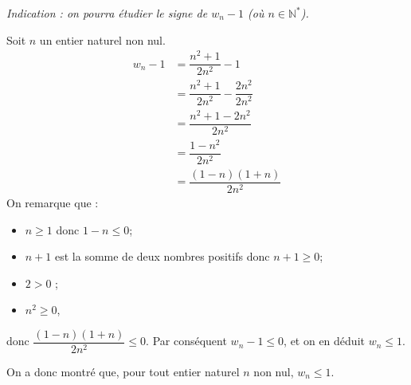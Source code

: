 \documentclass[a4paper,dvipsnames]{article}
\newcommand{\N}{\mathbb{N}}
\newenvironment{correction}{\color{blue}}{}
\begin{document}
\begin{exercice}[breakable]{}{}
\begin{enumerate}
      \textit{Indication : on pourra étudier le signe de $w_n-1$ (où $n\in\N^\ast$).}

      \begin{correction}
	Soit $n$ un entier naturel non nul.
	\[
	  \begin{aligned}
	    w_n - 1 &= \dfrac{n^2+1}{2n^2}-1\\
		    &= \dfrac{n^2+1}{2n^2}-\dfrac{2n^2}{2n^2}\\
		    &= \dfrac{n^2+1-2n^2}{2n^2}\\
		    &= \dfrac{1-n^2}{2n^2}\\
		    &= \dfrac{(1-n)(1+n)}{2n^2}
	  \end{aligned}
	\]
	On remarque que :
	\begin{itemize}
	  \item $n\geq 1$ donc $1-n\leq 0$;
	  \item $n+1$ est la somme de deux nombres positifs donc $n+1\geq 0$;
	  \item $2>0$ ;
	  \item $n^2\geq 0$,
	\end{itemize}
	donc $\dfrac{(1-n)(1+n)}{2n^2}\leq 0$. Par conséquent $w_n-1\leq 0$, et on en déduit $w_n\leq 1$.

	On a donc montré que, pour tout entier naturel $n$ non nul, $w_n\leq 1$.
      \end{correction}
  \end{enumerate}
\end{exercice}
\end{document}
